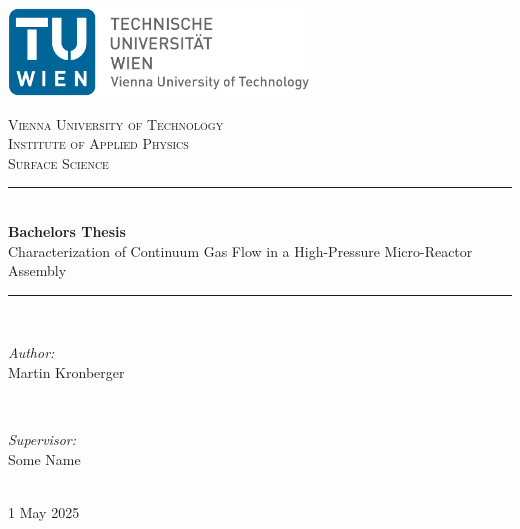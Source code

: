 \thispagestyle{empty}

\newcommand{\HRule}{\rule{\linewidth}{0.5mm}} %

\includegraphics[width=8cm]{src/00_intro/logo_en.jpg}
\vspace{3cm}

\begin{center} %

\textsc{\LARGE Vienna University of Technology}\\[1cm] 
\textsc{\Large Institute of Applied Physics}\\[1cm]
\textsc{\large Surface Science}\\[3cm]

\HRule \\[0.4cm]
{\Huge \bfseries Bachelors Thesis}\\[0.5cm] %
{\Large Characterization of Continuum Gas Flow in a High-Pressure Micro-Reactor Assembly}
\HRule \\[2cm]


\begin{minipage}{0.4\textwidth}
\begin{flushleft} \large
	\emph{Author:}\\
	Martin Kronberger\\
	\end{flushleft}
	\end{minipage}
~
\begin{minipage}{0.5\textwidth}
\begin{flushright} \large
	\emph{Supervisor:}\\
	Some Name\\
\end{flushright}
\end{minipage}\
\vspace{1cm}
\makeatletter
\vspace{1cm}\\
{\large 1 May 2025}
\end{center}

\blankpage
